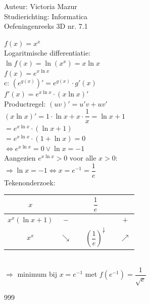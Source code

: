\documentclass[a4paper]{article}
\begin{document}
 
\noindent \large Auteur: Victoria Mazur \\
\noindent \large Studierichting: Informatica\\
\noindent \large Oefeningenreeks 3D nr. 7.1\\

\medskip

\normalsize

$f(x) = x^x$ \\

Logaritmische differentiatie: \\

$\ln f(x) = \ln(x^x) = x \ln x$ \\

$f(x) = e^{x \ln x}$ \\

c: $(e^{g(x)})' = e^{g(x)} \cdot g'(x)$ \\

$f'(x) = e^{x \ln x} \cdot (x \ln x)'$ \\

Productregel: $(uv)' = u'v + uv'$ \\

$(x \ln x)' = 1 \cdot \ln x + x \cdot \dfrac{1}{x} = \ln x + 1$ \\

$= e^{x \ln x} \cdot (\ln x + 1)$ \\

$= e^{x \ln x} \cdot (1 + \ln x) = 0$ \\

$\Leftrightarrow e^{x \ln x} = 0 \vee \ln x = -1$ \\

Aangezien $e^{x \ln x} > 0$ voor alle $x > 0$: \\

$\Rightarrow \ln x = -1 \Leftrightarrow x = e^{-1} = \dfrac{1}{e}$ \\

Tekenonderzoek: \\

\begin{tabular}{ c| c c c c c }
$x$ && &$\dfrac{1}{e}$ & & \\ 
\hline
$x^{x}\left(\ln x + 1\right)$ & $-$ &  &&  & $+$    \\
\hline
$x^{x}$  & $\searrow$ & &$\left(\dfrac{1}{e}\right)^{\tfrac{1}{e}}$& &$\nearrow$ 
\end{tabular} \\

$\Rightarrow$ minimum bij $x = e^{-1}$ met $f\left(e^{-1}\right) = \dfrac{1}{\sqrt{e}}$ \\

\begin{thebibliography}{999}
\end{thebibliography}
\end{document}
